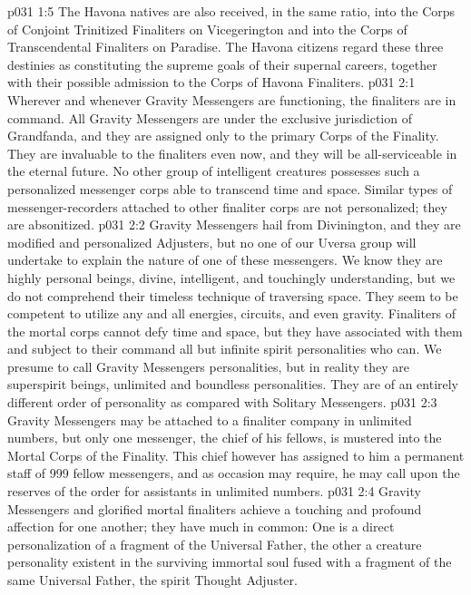 \vs p031 1:5 The Havona natives are also received, in the same ratio, into the Corps of Conjoint Trinitized Finaliters on Vicegerington and into the Corps of Transcendental Finaliters on Paradise. The Havona citizens regard these three destinies as constituting the supreme goals of their supernal careers, together with their possible admission to the Corps of Havona Finaliters.\plusone
{}
\vs p031 2:1 Wherever and whenever Gravity Messengers are functioning, the finaliters are in command. All Gravity Messengers are under the exclusive jurisdiction of Grandfanda, and they are assigned only to the primary Corps of the Finality. They are invaluable to the finaliters even now, and they will be all\hyp{}serviceable in the eternal future. No other group of intelligent creatures possesses such a personalized messenger corps able to transcend time and space. Similar types of messenger\hyp{}recorders attached to other finaliter corps are not personalized; they are absonitized.
\pc \vs p031 2:2 Gravity Messengers hail from Divinington, and they are modified and personalized Adjusters, but no one of our Uversa group will undertake to explain the nature of one of these messengers. We know they are highly personal beings, divine, intelligent, and touchingly understanding, but we do not comprehend their timeless technique of traversing space. They seem to be competent to utilize any and all energies, circuits, and even gravity. Finaliters of the mortal corps cannot defy time and space, but they have associated with them and subject to their command all but infinite spirit personalities who can. We presume to call Gravity Messengers personalities, but in reality they are superspirit beings, unlimited and boundless personalities. They are of an entirely different order of personality as compared with Solitary Messengers.
\pc \vs p031 2:3 Gravity Messengers may be attached to a finaliter company in unlimited numbers, but only one messenger, the chief of his fellows, is mustered into the Mortal Corps of the Finality. This chief however has assigned to him a permanent staff of 999 fellow messengers, and as occasion may require, he may call upon the reserves of the order for assistants in unlimited numbers.\plusone
\vs p031 2:4 Gravity Messengers and glorified mortal finaliters achieve a touching and profound affection for one another; they have much in common: One is a direct personalization of a fragment of the Universal Father, the other a creature personality existent in the surviving immortal soul fused with a fragment of the same Universal Father, the spirit Thought Adjuster.
